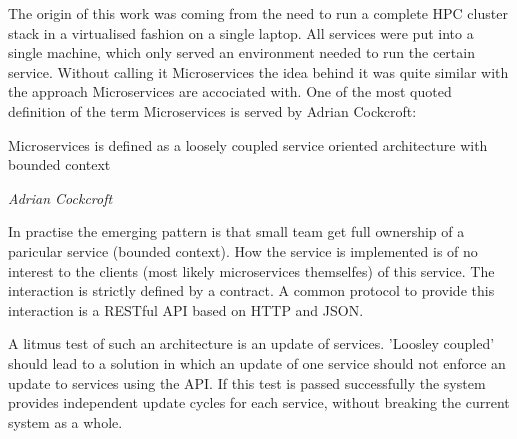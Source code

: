 The origin of this work was coming from the need to run a complete HPC cluster stack in a virtualised fashion on a single laptop.
All services were put into a single machine, which only served an environment needed to run the certain service.
Without calling it Microservices the idea behind it was quite similar with the approach Microservices are accociated with.
One of the most quoted definition of the term Microservices is served by Adrian Cockcroft:
\epigraph{Microservices is defined as a loosely coupled service oriented architecture with bounded context}{\textit{Adrian Cockcroft}}
In practise the emerging pattern is that small team get full ownership of a paricular service (bounded context).
How the service is implemented is of no interest to the clients (most likely microservices themselfes) of this service.
The interaction is strictly defined by a contract. A common protocol to provide this interaction is a RESTful API based on HTTP and JSON.

A litmus test of such an architecture is an update of services. 'Loosley coupled' should lead to a solution in which an update of one service
should not enforce an update to services using the API. If this test is passed successfully the system provides
independent update cycles for each service, without breaking the current system as a whole.